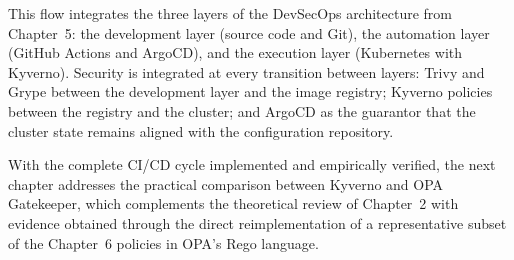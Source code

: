 This flow integrates the three layers of the DevSecOps architecture from Chapter~5: the development layer (source code and Git), the automation layer (GitHub Actions and ArgoCD), and the execution layer (Kubernetes with Kyverno). Security is integrated at every transition between layers: Trivy and Grype between the development layer and the image registry; Kyverno policies between the registry and the cluster; and ArgoCD as the guarantor that the cluster state remains aligned with the configuration repository.

With the complete CI/CD cycle implemented and empirically verified, the next chapter addresses the practical comparison between Kyverno and OPA Gatekeeper, which complements the theoretical review of Chapter~2 with evidence obtained through the direct reimplementation of a representative subset of the Chapter~6 policies in OPA's Rego language.
